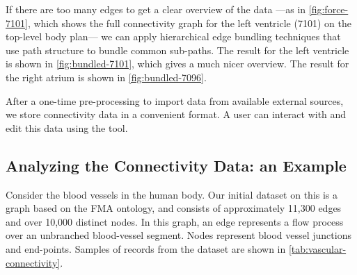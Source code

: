 If there are too many edges to get a clear overview of the data ---as in \cref{fig:force-7101},
which shows the full connectivity graph for the left ventricle (7101) on the top-level body plan---
we can apply hierarchical edge bundling techniques that use path structure to bundle common sub-paths.
The result for the left ventricle is shown in \cref{fig:bundled-7101}, which gives a much nicer
overview. The result for the right atrium is shown in \cref{fig:bundled-7096}.

After a one-time pre-processing to import data from available external sources, we store connectivity data in a convenient format. A user can interact with and edit this data using the tool.


\subsection{Analyzing the Connectivity Data: an Example} %
\label{sec:process-graphs-example}

Consider the blood vessels in the human body. Our initial dataset on this is a graph based on the FMA ontology, and consists of approximately 11,300 edges and over 10,000 distinct nodes. In this graph, an edge represents a flow process over an unbranched blood-vessel segment. Nodes represent blood vessel junctions and end-points. Samples of records from the dataset are shown in \cref{tab:vascular-connectivity}.

